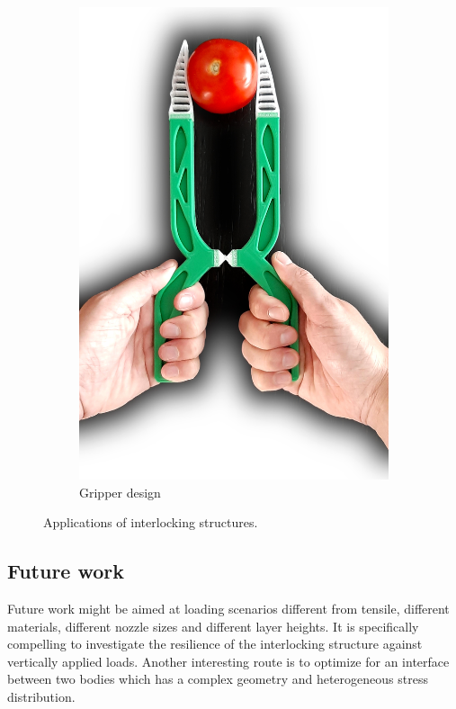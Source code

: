 \begin{figure}
	\centering
	\begin{subfigure}[B]{.33\columnwidth}
		\centering
		\includegraphics[width=\columnwidth]{sources/applications/gripper.jpg}
		\caption{Gripper design}
		\label{fig:gripper}
	\end{subfigure}
	\caption{Applications of interlocking structures.}
\end{figure}




\subsection{Future work}
Future work might be aimed at loading scenarios different from tensile, different materials, different nozzle sizes and different layer heights.
It is specifically compelling to investigate the resilience of the interlocking structure against vertically applied loads.
Another interesting route is to optimize for an interface between two bodies which has a complex geometry and heterogeneous stress distribution.

